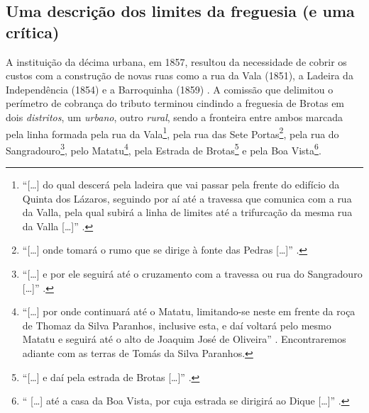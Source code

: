 
\subsection{Uma descrição dos limites da freguesia (e uma crítica)}\label{subsec:descrit}

A instituição da décima urbana, em 1857, resultou da necessidade de cobrir os custos com a construção de novas ruas como a rua da Vala (1851), a Ladeira da Independência (1854) e a Barroquinha (1859) \cite[p.~309]{ruy_camara_1953}. A comissão que delimitou o perímetro de cobrança do tributo terminou cindindo a freguesia de Brotas em dois \textit{distritos}, um \textit{urbano}, outro \textit{rural}, sendo a fronteira entre ambos marcada pela linha formada pela rua da Vala\footnote{``[\dots] do qual descerá pela ladeira que vai passar pela frente do edifício da Quinta dos Lázaros, seguindo por aí até a travessa que comunica com a rua da Valla, pela qual subirá a linha de limites até a trifurcação da mesma rua da Valla [\dots]'' \cite[pp.~309-310]{ruy_camara_1953}.}, pela rua das Sete Portas\footnote{``[\dots] onde tomará o rumo que se dirige à fonte das Pedras [\dots]'' \cite[pp.~309-310]{ruy_camara_1953}.}, pela rua do Sangradouro\footnote{``[\dots] e por ele seguirá até o cruzamento com a travessa ou rua do Sangradouro [\dots]'' \cite[p.~310]{ruy_camara_1953}.}, pelo Matatu\footnote{``[\dots] por onde continuará até o Matatu, limitando-se neste em frente da roça de Thomaz da Silva Paranhos, inclusive esta, e daí voltará pelo mesmo Matatu e seguirá até o alto de Joaquim José de Oliveira'' \cite[p.~310]{ruy_camara_1953}. Encontraremos adiante com as terras de Tomás da Silva Paranhos.}, pela Estrada de Brotas\footnote{``[\dots] e daí pela estrada de Brotas [\dots]'' \cite[p.~310]{ruy_camara_1953}.} e pela Boa Vista\footnote{`` [\dots] até a casa da Boa Vista, por cuja estrada se dirigirá ao Dique [\dots]'' \cite[p.~310]{ruy_camara_1953}.}. 

